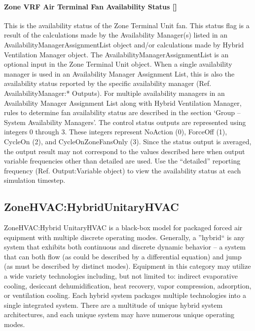 \paragraph{Zone VRF Air Terminal Fan Availability Status {[]}}\label{zone-vrf-air-terminal-fan-availability-status}

This is the availability status of the Zone Terminal Unit fan. This status flag is a result of the calculations made by the Availability Manager(s) listed in an AvailabilityManagerAssignmentList object and/or calculations made by Hybrid Ventilation Manager object. The AvailabilityManagerAssignmentList is an optional input in the Zone Terminal Unit object. When a single availability manager is used in an Availability Manager Assignment List, this is also the availability status reported by the specific availability manager (Ref. AvailabilityManager:* Outputs). For multiple availability managers in an Availability Manager Assignment List along with Hybrid Ventilation Manager, rules to determine fan availability status are described in the section `Group -- System Availability Managers'. The control status outputs are represented using integers 0 through 3. These integers represent NoAction (0), ForceOff (1), CycleOn (2), and CycleOnZoneFansOnly (3). Since the status output is averaged, the output result may not correspond to the values described here when output variable frequencies other than detailed are used. Use the ``detailed'' reporting frequency (Ref. Output:Variable object) to view the availability status at each simulation timestep.

\subsection{ZoneHVAC:HybridUnitaryHVAC}\label{zonehvac-hybridunitaryhvac}

ZoneHVAC:Hybrid UnitaryHVAC is a black-box model for packaged forced air equipment with multiple discrete operating modes. Generally, a ''hybrid`` is any system that exhibits both continuous and discrete dynamic behavior – a system that can both flow (as could be described by a differential equation) and jump (as must be described by distinct modes). Equipment in this category may utilize a wide variety technologies including, but not limited to: indirect evaporative cooling, desiccant dehumidification, heat recovery, vapor compression, adsorption, or ventilation cooling. Each hybrid system packages multiple technologies into a single integrated system. There are a multitude of unique hybrid system architectures, and each unique system may have numerous unique operating modes.

